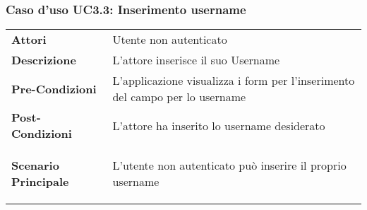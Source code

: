 \subsubsection{Caso d'uso UC3.3:  Inserimento username}
\label{UC3_3}

\begin{longtable}{ l | p{11cm}}
	\hline
	\rowcolor{Gray}
	 \multicolumn{2}{c}{UC3.3:  Inserimento username} \\
	 \hline
	\textbf{Attori} & Utente non autenticato \\
	\textbf{Descrizione} & L'attore inserisce il suo Username  \\
	\textbf{Pre-Condizioni} & L'applicazione visualizza i form per l'inserimento del campo per lo username \\
	\textbf{Post-Condizioni} & L'attore ha inserito lo username desiderato \\
	\textbf{Scenario Principale} & \begin{enumerate*}[label=(\arabic*.),itemjoin={\newline}]
		\item L'utente non autenticato può inserire il proprio username
	\end{enumerate*}\\
\end{longtable}